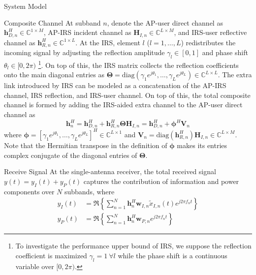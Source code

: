 \documentclass{IEEEtran}
\begin{document}
\begin{section}{System Model}
	\begin{subsection}{Composite Channel}
		At subband $n$, denote the AP-user direct channel as $\boldsymbol{h}_{D,n}^H \in \mathbb{C}^{1 \times M}$, AP-IRS incident channel as $\boldsymbol{H}_{I,n} \in \mathbb{C}^{L \times M}$, and IRS-user reflective channel as $\boldsymbol{h}_{R,n}^H \in \mathbb{C}^{1 \times L}$. At the IRS, element $l$ ($l=1,\dots,L$) redistributes the incoming signal by adjusting the reflection amplitude $\gamma_l \in [0,1]$ and phase shift $\theta_l \in [0,2\pi)$ \footnote{To investigate the performance upper bound of IRS, we suppose the reflection coefficient is maximized $\gamma_l=1 \ \forall l$ while the phase shift is a continuous variable over $[0,2\pi)$.}. On top of this, the IRS matrix collects the reflection coefficients onto the main diagonal entries as $\boldsymbol{\Theta} = \mathrm{diag}(\gamma_1 e^{j \theta_1}, \dots, \gamma_L e^{j \theta_L}) \in \mathbb{C}^{L \times L}$. The extra link introduced by IRS can be modeled as a concatenation of the AP-IRS channel, IRS reflection, and IRS-user channel. On top of this, the total composite channel is formed by adding the IRS-aided extra channel to the AP-user direct channel as
		\begin{equation}\label{eq:h_n}
			\boldsymbol{h}_{n}^H = \boldsymbol{h}_{D,n}^H + \boldsymbol{h}_{R,n}^H \boldsymbol{\Theta} \boldsymbol{H}_{I,n} = \boldsymbol{h}_{D,n}^H + \boldsymbol{\phi}^H \boldsymbol{V}_{n}
		\end{equation}
		where $\boldsymbol{\phi}=[\gamma_1 e^{j \theta_1}, \dots, \gamma_L e^{j \theta_L}]^H \in \mathbb{C}^{L \times 1}$ and $\boldsymbol{V}_{n}=\mathrm{diag}(\boldsymbol{h}_{R,n}^H)\boldsymbol{H}_{I,n} \in \mathbb{C}^{L \times M}$. Note that the Hermitian transpose in the definition of $\boldsymbol{\phi}$ makes its entries complex conjugate of the diagonal entries of $\boldsymbol{\Theta}$.
	\end{subsection}

	\begin{subsection}{Receive Signal}
		At the single-antenna receiver, the total received signal $y(t)=y_I(t)+y_P(t)$ captures the contribution of information and power components over $N$ subbands, where
		\begin{align}\label{eq:y_IP}
			y_{I}(t) & = \Re\left\{\sum_{n=1}^N{\boldsymbol{h}_{n}^H}{\boldsymbol{w}_{I,n}\tilde{x}_{I,n}(t)}{e^{j2{\pi}{f_n}{t}}}\right\}\\
			y_{P}(t) & = \Re\left\{\sum_{n=1}^N{\boldsymbol{h}_{n}^H}\boldsymbol{w}_{P,n}{e^{j2{\pi}{f_n}{t}}}\right\}
		\end{align}
	\end{subsection}


\end{section}
\end{document}

